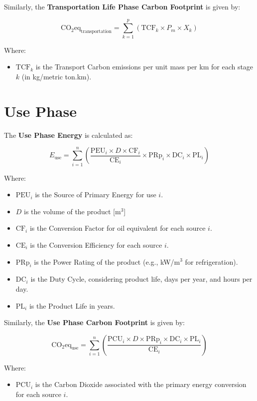 \documentclass[a4paper, twocolumn]{article}
\begin{document}
Similarly, the \textbf{Transportation Life Phase Carbon Footprint} is given by:

\[
\text{CO}_2\text{eq}_{\text{transportation}} = \sum_{k=1}^{p} \left( \text{TCF}_k \times P_m \times X_k \right)
\]

Where:
\begin{itemize}
    \item \( \text{TCF}_k \) is the Transport Carbon emissions per unit mass per km for each stage \(k\) (in kg/metric ton.km).
\end{itemize}

\section*{Use Phase}

The \textbf{Use Phase Energy} is calculated as:

\[
E_{\text{use}} = \sum_{i=1}^{n} \left( \frac{\text{PEU}_i \times D \times \text{CF}_i}{\text{CE}_i} \times \text{PRp}_i \times \text{DC}_i \times \text{PL}_i \right)
\]

Where:
\begin{itemize}
    \item \( \text{PEU}_i \) is the Source of Primary Energy for use \(i\).
    \item \( D \) is the volume of the product [m\(^3\)]
    \item \( \text{CF}_i \) is the Conversion Factor for oil equivalent for each source \(i\).
    \item \( \text{CE}_i \) is the Conversion Efficiency for each source \(i\).
    \item \( \text{PRp}_i \) is the Power Rating of the product (e.g., kW/m\(^3\) for refrigeration).
    \item \( \text{DC}_i \) is the Duty Cycle, considering product life, days per year, and hours per day.
    \item \( \text{PL}_i \) is the Product Life in years.
\end{itemize}

Similarly, the \textbf{Use Phase Carbon Footprint} is given by:

\[
\text{CO}_2\text{eq}_{\text{use}} = \sum_{i=1}^{n} \left( \frac{\text{PCU}_i \times D \times \text{PRp}_i \times \text{DC}_i \times \text{PL}_i}{\text{CE}_i} \right)
\]

Where:
\begin{itemize}
    \item \( \text{PCU}_i \) is the Carbon Dioxide associated with the primary energy conversion for each source \(i\).
\end{itemize}
\end{document}

